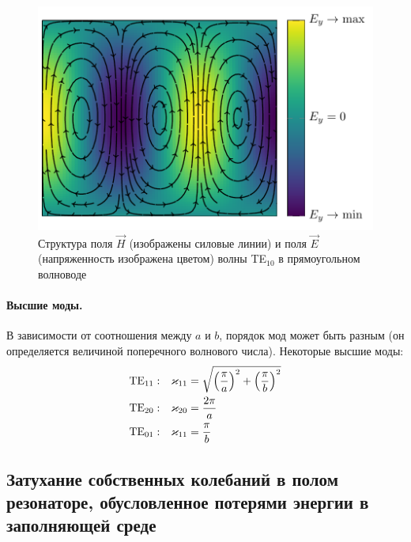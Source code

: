 \begin{figure}[H]
	\centering
	\includegraphics[scale=0.6]{img/lect4_ris11}
	\caption{Структура поля $\vec{H}$ (изображены силовые линии) и поля $\vec{E}$ (напряженность изображена цветом) волны TE$_{10}$ в прямоугольном волноводе}
	\label{fig:lect4:11}
\end{figure}

\paragraph{Высшие моды.} В зависимости от соотношения между $a$ и $b$, порядок мод может быть разным (он определяется величиной поперечного волнового числа). Некоторые высшие моды:
\begin{equation}
\begin{aligned}
 		\text{TE}_{11}:& \quad  \varkappa_{11}=\sqrt{\qty(\frac{\pi}{a})^2+\qty(\frac{\pi}{b})^2}\\
 		\text{TE}_{20}:& \quad  \varkappa_{20}=\frac{2\pi}{a} \\
 		\text{TE}_{01}:& \quad  \varkappa_{11}=\frac{\pi}{b}
\end{aligned} 	
\end{equation} 


\subsection{Затухание собственных колебаний в полом резонаторе, обусловленное потерями энергии в заполняющей среде}

